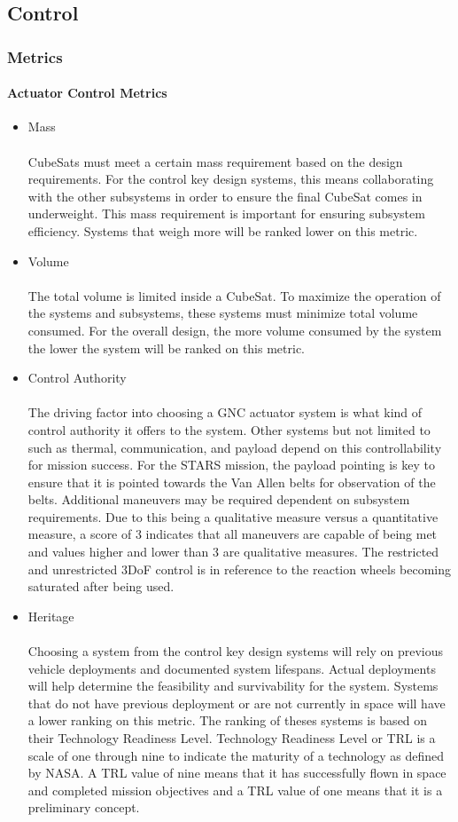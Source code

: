
\subsection{Control}
\subsubsection{Metrics}
\paragraph{Actuator Control Metrics}
\begin{itemize}
\item{Mass}\\ 
\\
CubeSats must meet a certain mass requirement based on the design requirements. For the control key design systems, this means collaborating with the other subsystems in order to ensure the final CubeSat comes in underweight. This mass requirement is important for ensuring subsystem efficiency. Systems that weigh more will be ranked lower on this metric.
\item{Volume} \\
\\
The total volume is limited inside a CubeSat. To maximize the operation of the systems and subsystems, these systems must minimize total volume consumed. For the overall design, the more volume consumed by the system the lower the system will be ranked on this metric.
\item{Control Authority} \\
\\
The driving factor into choosing a GNC actuator system is what kind of control authority it offers to the system. Other systems but not limited to such as thermal, communication, and payload depend on this controllability for mission success. For the STARS mission, the payload pointing is key to ensure that it is pointed towards the Van Allen belts for observation of the belts. Additional maneuvers may be required dependent on subsystem requirements. Due to this being a qualitative measure versus a quantitative measure, a score of 3 indicates that all maneuvers are capable of being met and values higher and lower than 3 are qualitative measures. The restricted and unrestricted 3DoF control is in reference to the reaction wheels becoming saturated after being used. 
\item{Heritage} \\ 
\\ 
Choosing a system from the control key design systems will rely on previous vehicle deployments and documented system lifespans. Actual deployments will help determine the feasibility and survivability for the system. Systems that do not have previous deployment or are not currently in space will have a lower ranking on this metric. The ranking of theses systems is based on their Technology Readiness Level. Technology Readiness Level or TRL is a scale of one through nine to indicate the maturity of a technology as defined by NASA\cite{TRL}. A TRL value of nine means that it has successfully flown in space and completed mission objectives and a TRL value of one means that it is a preliminary concept.
\end{itemize}

